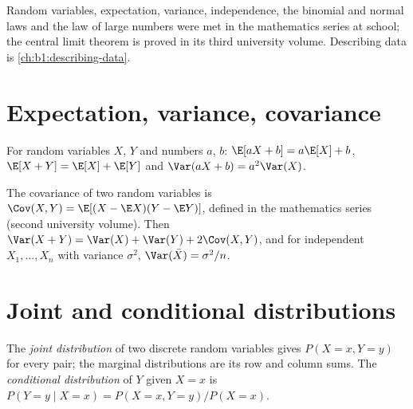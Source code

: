 \begin{recall}
Random variables, expectation, variance, independence, the binomial and
normal laws and the law of large numbers were met in the mathematics
series at school; the central limit theorem is proved in its third
university volume. Describing data is \cref{ch:b1:describing-data}.
\end{recall}

\section{Expectation, variance, covariance}\label{sec:b1:random-variables-for-econometrics:moments}

For random variables $X$, $Y$ and numbers $a$, $b$: $\E[aX + b] = a\E[X] + b$, $\E[X + Y] = \E[X] + \E[Y]$
and $\Var(aX + b) = a^2\Var(X)$.

\begin{notation}
The covariance of two random variables is $\Cov(X, Y) = \E[(X - \E X)(Y - \E Y)]$, defined in
the mathematics series (second university volume). Then
$\Var(X + Y) = \Var(X) + \Var(Y) + 2\Cov(X, Y)$, and for independent $X_1, \dots, X_n$ with variance $\sigma^2$,
$\Var(\bar X) = \sigma^2/n$.
\end{notation}

\section{Joint and conditional distributions}\label{sec:b1:random-variables-for-econometrics:joint}

\begin{definition}\label{def:b1:random-variables-for-econometrics:joint}
The \emph{joint distribution} of two discrete random variables gives
$P(X = x, Y = y)$ for every pair; the marginal distributions are its row and
column sums. The \emph{conditional distribution} of $Y$ given $X = x$ is
$P(Y = y \mid X = x) = P(X = x, Y = y)/P(X = x)$.
\end{definition}

\label{lst:b1:random-variables-for-econometrics:joint}

